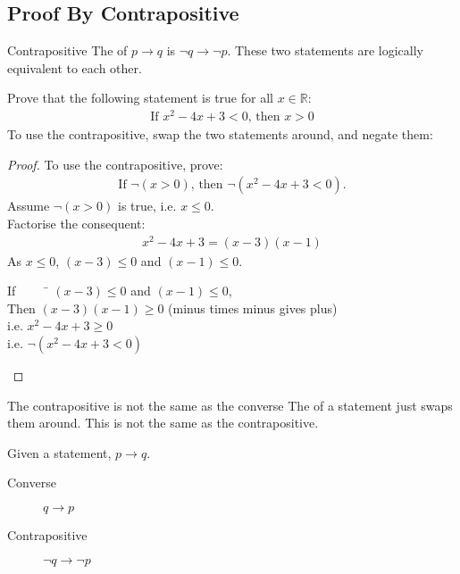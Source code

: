 \documentclass[\main/notes.tex]{subfiles}
\begin{document}
			\subsection{Proof By Contrapositive}
				\begin{definition}{Contrapositive}
					The  of $p \rightarrow q$ is $\lnot q \rightarrow \lnot p$. These two statements are logically equivalent to each other.
				\end{definition}
				\begin{example}
					Prove that the following statement is true for all $x \in \mathbb{R}$:
					\begin{align*}
						\text{If } x^{2} - 4x + 3 < 0 \text{, then } x > 0
					\end{align*}
					To use the contrapositive, swap the two statements around, and negate them:
					\begin{proof}
						To use the contrapositive, prove:
						\begin{align*}
							\text{If } \lnot(x > 0) \text{, then } \lnot(x^{2} - 4x + 3 < 0).
						\end{align*}
						Assume $\lnot (x > 0)$ is true, i.e. $x \leq 0$.\\
						Factorise the consequent:
						\begin{align*}
							x^{2} - 4x + 3 = (x - 3)(x - 1)
						\end{align*}
						As $x \leq 0$, $(x - 3) \leq 0$ and $(x - 1) \leq 0$.
						\begin{tabbing}
							If $\qquad$ \= $(x - 3) \leq 0$ and $(x - 1) \leq 0$,\\
							Then \> $(x - 3)(x - 1) \geq 0$ (minus times minus gives plus)\\
							i.e. \> $x^{2} - 4x + 3 \geq 0$\\
							i.e. \> $\lnot (x^{2} - 4x + 3 < 0)$
						\end{tabbing}
					\end{proof}
				\end{example}
				\begin{sidenote}[width=0.8\textwidth]{The contrapositive is not the same as the converse}
					The  of a statement just swaps them around. This is not the same as the contrapositive.
					\begin{example}[width=0.6\textwidth]
						Given a statement, $p \rightarrow q$.
						\begin{description}
							\item[Converse] $q \rightarrow p$
							\item[Contrapositive] $\lnot q \rightarrow \lnot p$ 
						\end{description} 
					\end{example}
				\end{sidenote}
\end{document}
